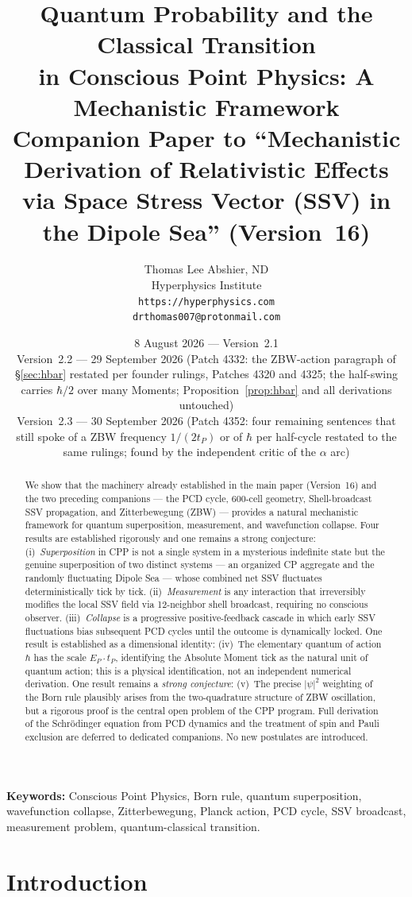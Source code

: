 \documentclass[12pt]{article}
\title{\textbf{Quantum Probability and the Classical Transition\\
in Conscious Point Physics: A Mechanistic Framework}\\[6pt]
{\large Companion Paper to ``Mechanistic Derivation of Relativistic Effects\\
via Space Stress Vector (SSV) in the Dipole Sea'' (Version~16)}}
\author{Thomas Lee Abshier, ND\\
Hyperphysics Institute\\
\texttt{https://hyperphysics.com}\\
\texttt{drthomas007@protonmail.com}}
\date{8 August 2026 --- Version~2.1\\[2pt]
{\small Version~2.2 --- 29 September 2026 (Patch 4332: the ZBW-action paragraph of
\S\ref{sec:hbar} restated per founder rulings, Patches 4320 and 4325; the half-swing carries
$\hbar/2$ over many Moments; Proposition~\ref{prop:hbar} and all derivations untouched)}\\[2pt]
{\small Version~2.3 --- 30 September 2026 (Patch 4352: four remaining sentences that still spoke of a ZBW frequency $1/(2t_P)$ or of $\hbar$ per half-cycle restated to the same rulings; found by the independent critic of the $\alpha$ arc)}}
\newcommand{\EP}{E_P}
\newcommand{\tP}{t_P}
\begin{document}
\maketitle

\noindent\textbf{Keywords:} Conscious Point Physics, Born rule, quantum
superposition, wavefunction collapse, Zitterbewegung, Planck action, PCD
cycle, SSV broadcast, measurement problem, quantum-classical transition.

\begin{abstract}
We show that the machinery already established in the main paper (Version~16)
and the two preceding companions --- the PCD cycle, 600-cell geometry,
Shell-broadcast SSV propagation, and Zitterbewegung (ZBW) --- provides a
natural mechanistic framework for quantum superposition, measurement, and
wavefunction collapse.  Four results are established rigorously and one
remains a strong conjecture:
(i)~\emph{Superposition} in CPP is not a single system in a mysterious
indefinite state but the genuine superposition of two distinct systems ---
an organized CP aggregate and the randomly fluctuating Dipole Sea --- whose
combined net SSV fluctuates deterministically tick by tick.
(ii)~\emph{Measurement} is any interaction that irreversibly modifies the
local SSV field via 12-neighbor shell broadcast, requiring no conscious
observer.
(iii)~\emph{Collapse} is a progressive positive-feedback cascade in which
early SSV fluctuations bias subsequent PCD cycles until the outcome is
dynamically locked.
One result is established as a dimensional identity:
(iv)~The elementary quantum of action $\hbar$ has the scale $\EP\cdot\tP$,
identifying the Absolute Moment tick as the natural unit of quantum action;
this is a physical identification, not an independent numerical derivation.
One result remains a \emph{strong conjecture}:
(v)~The precise $|\psi|^2$ weighting of the Born rule plausibly arises from
the two-quadrature structure of ZBW oscillation, but a rigorous proof is the
central open problem of the CPP program.
Full derivation of the Schr\"odinger equation from PCD dynamics and the
treatment of spin and Pauli exclusion are deferred to dedicated companions.
No new postulates are introduced.
\end{abstract}

\section{Introduction}
\label{sec:intro}
\end{document}
